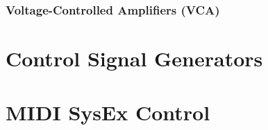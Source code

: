 \documentclass[a4paper]{article}
\begin{document}
\subsubsection{Voltage-Controlled Amplifiers (VCA)}


\section{Control Signal Generators}


\section{MIDI SysEx Control}


{}


\end{document}
